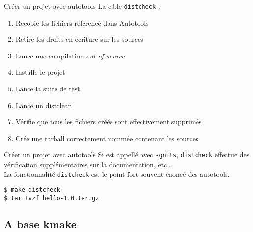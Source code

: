 \begin{frame}[fragile=singleslide]{Créer un projet avec autotools}
  La cible \verb+distcheck+ :
  \begin{enumerate}
  \item Recopie les fichiers référencé dans Autotools
  \item Retire les droits en écriture sur les sources
  \item Lance une compilation \emph{out-of-source}
  \item Installe le projet
  \item Lance la suite de test
  \item Lance un distclean
  \item Vérifie que tous les fichiers créés sont effectivement supprimés
  \item Crée une tarball correctement nommée contenant les sources
  \end{enumerate}
\end{frame}

\begin{frame}[fragile=singleslide]{Créer un projet avec autotools}
  Si   est appellé avec  \verb+-gnits+, \verb+distcheck+
  effectue des vérification supplémentaires sur la documentation,
  etc... 
  \\[2ex]
  La fonctionnalité \verb+distcheck+ est  le point fort souvent énoncé
  des autotools.
\begin{lstlisting}
$ make distcheck
$ tar tvzf hello-1.0.tar.gz
\end{lstlisting} %
\end{frame}


\subsection{A base kmake}

